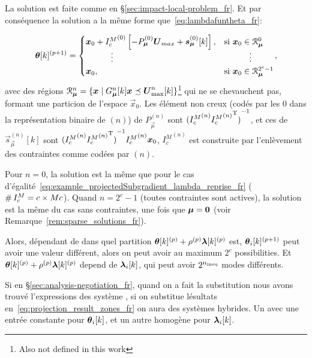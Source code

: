 \documentclass[../main.tex]{subfiles}
\begin{document}
La solution est faite comme en \S\ref{sec:impact-local-problem_fr}.
Et par conséquence la solution a la même forme \pwa{} que~\eqref{eq:lambdafuntheta_fr}:

\begin{equation}
  \label{eq:projection_result_zones_fr}
  \begin{aligned}
    \vec{\theta}[k]\pplusone=
    \begin{cases}
      \vec{x}_{0}+
      {I_{c}^{M}}^{(0)}\left[-P_{\vec{\mu}}^{(0)}\vec{U}_{max}+\vec{s}_{\vec{\mu}}^{(0)}[k]\right],&\text{si}\ \vec{x}_{0}\in\set{R}_{\vec{\mu}}^{0}\\
      \qquad\quad \vdots&\qquad\quad \vdots\\
      \vec{x}_{0},&\text{si}\ \vec{x}_{0}\in\set{R}_{\vec{\mu}}^{2^{c}-1}\\
    \end{cases}
  \end{aligned},
\end{equation}
avec des régions ${\mathcal{R}_{\boldsymbol{\mu}}^{n}=\{\boldsymbol{x}\mid G_{\boldsymbol{\mu}}^{n}[k]\boldsymbol{x} \preceq \boldsymbol{U}_{\max}^{n}[k]\}}$\footnote{Also not defined in this work} qui ne se chevauchent pas, formant une particion de l'espace $\vec{x}_{0}$.
Les élément non creux (codés par les $0$ dans la représentation binaire de $(n)$) de $P_{\vec{\mu}}^{(n)}$ sont ${({I_{c}^{M}}^{(n)}{{I_{c}^{M}}^{(n)}}^{\mathrm{T}})}^{-1}$, et ces de $\vec{s}_{\vec{\mu}}^{(n)}[k]$ sont ${{({I_{c}^{M}}^{(n)}{{I_{c}^{M}}^{(n)}}^{\mathrm{T}})}^{-1}{I_{c}^{M}}^{(n)}\boldsymbol{x}_{0}}$, ${I_{c}^{M}}^{(n)}$ est construite par l'enlèvement des contraintes comme codées par $(n)$.

Pour $n=0$, la solution est la même que pour le cas d'égalité~\eqref{eq:example_projectedSubgradient_lambda_reprise_fr} ($\operatorname{\#}{I_{c}^{M}}=c\times Mc$).
Quand $n=2^{c}-1$ (toutes contraintes sont actives), la solution est la même du cas sans contraintes, une fois que $\boldsymbol{\mu}=\mathbf{0}$ (voir Remarque~\ref{rem:sparse_solutions_fr}).

Alors, dépendant de dans quel partition $\boldsymbol{\theta}[k]^{(p)}+\rho^{(p)}\boldsymbol{\lambda}[k]^{(p)}$ est,
$\thetaik\pplusone$ peut avoir une valeur différent, alors on peut avoir au maximum $2^{c}$ possibilities.
Et $\boldsymbol{\theta}[k]^{(p)}+\rho^{(p)}\boldsymbol{\lambda}[k]^{(p)}$ depend de $\lambdaik$, qui peut avoir $2^{n_{\text{ineq}}}$ modes différents.

Si en \S\ref{sec:analysis-negotiation_fr}, quand on a fait la substitution nous avons trouvé l'expressions des système \dt{}, si on substitue lésultats en~\eqref{eq:projection_result_zones_fr} on aura des systèmes \dt{} hybrides.
Un avec une entrée constante pour $\thetaik$, et un autre homogène pour $\lambdaik$.
\end{document}

